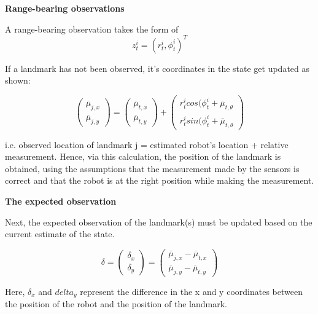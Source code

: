 \documentclass[a4paper]{article}
\begin{document}
\textbf{Range-bearing observations}

A range-bearing observation takes the form of 
\begin{equation*}
    z_t^i = (r_t^i, \phi_t^i)^T
\end{equation*}

If a landmark has not been observed, it's coordinates in the state get updated as shown:

\begin{equation*}
    \begin{pmatrix}
        \overline{\mu}_{j,x} \\ \overline{\mu}_{j,y}
    \end{pmatrix}
    =
    \begin{pmatrix}
            \overline{\mu}_{t,x} \\ \overline{\mu}_{t,y}
    \end{pmatrix} 
    + 
    \begin{pmatrix}
            r_t^i cos(\phi_t^i + \overline{\mu}_{t,\theta}
            \\
            r_t^i sin(\phi_t^i + \overline{\mu}_{t,\theta}
    \end{pmatrix}
\end{equation*}

i.e. observed location of landmark j = estimated robot's location + relative measurement. Hence, via this calculation, the position of the landmark is obtained, using the assumptions that the measurement made by the sensors is correct and that the robot is at the right position while making the measurement.

\textbf{The expected observation}

Next, the expected observation of the landmark(s) must be updated based on the current estimate of the state.

\begin{equation*}
    \delta = 
    \begin{pmatrix}
            \delta_x \\ \delta_y
    \end{pmatrix} 
    = 
    \begin{pmatrix}
        \overline{\mu}_{j,x} - \overline{\mu}_{t,x}
        \\
        \overline{\mu}_{j,y} - \overline{\mu}_{t,y}
    \end{pmatrix}
\end{equation*}

Here, $\delta_x$ and $delta_y$ represent the difference in the x and y coordinates between the position of the robot and the position of the landmark.
\end{document}
